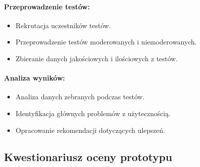 \paragraph{Przeprowadzenie testów:}
\begin{itemize}
  \item Rekrutacja uczestników testów.
  \item Przeprowadzenie testów moderowanych i niemoderowanych.
  \item Zbieranie danych jakościowych i ilościowych z testów.
\end{itemize}

\paragraph{Analiza wyników:}
\begin{itemize}
  \item Analiza danych zebranych podczas testów.
  \item Identyﬁkacja głównych problemów z użytecznością.
  \item Opracowanie rekomendacji dotyczących ulepszeń.
\end{itemize}

\begin{center}
  \subsection{Kwestionariusz oceny prototypu}
\end{center}

